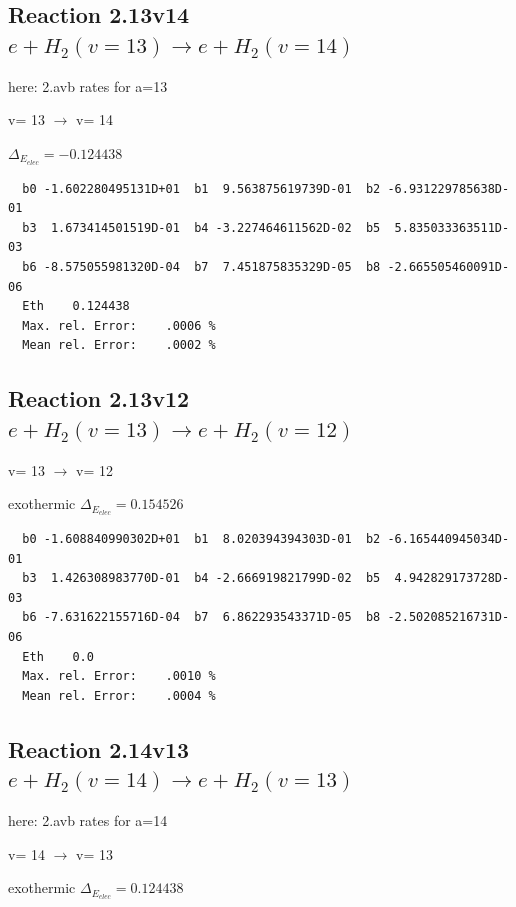 \documentclass[12pt,dvipdfmx]{article}
\begin{document}
\subsection{
Reaction 2.13v14
$ e + H_2(v=13) \rightarrow e + H_2(v=14) $
}
here: 2.avb rates for a=13


  v=  13 $\rightarrow$ v= 14

$\Delta_{E_{elec}}=-0.124438$


\begin{small}\begin{verbatim}
  b0 -1.602280495131D+01  b1  9.563875619739D-01  b2 -6.931229785638D-01
  b3  1.673414501519D-01  b4 -3.227464611562D-02  b5  5.835033363511D-03
  b6 -8.575055981320D-04  b7  7.451875835329D-05  b8 -2.665505460091D-06
  Eth    0.124438
  Max. rel. Error:    .0006 %
  Mean rel. Error:    .0002 %

\end{verbatim}\end{small}


\subsection{
Reaction 2.13v12
$ e + H_2(v=13) \rightarrow e + H_2(v=12) $
}

  v=  13 $\rightarrow$ v= 12

exothermic $\Delta_{E_{elec}}= 0.154526$




\begin{small}\begin{verbatim}
  b0 -1.608840990302D+01  b1  8.020394394303D-01  b2 -6.165440945034D-01
  b3  1.426308983770D-01  b4 -2.666919821799D-02  b5  4.942829173728D-03
  b6 -7.631622155716D-04  b7  6.862293543371D-05  b8 -2.502085216731D-06
  Eth    0.0
  Max. rel. Error:    .0010 %
  Mean rel. Error:    .0004 %

\end{verbatim}\end{small}

\newpage

\subsection{
Reaction 2.14v13
$ e + H_2(v=14) \rightarrow e + H_2(v=13) $
}

here: 2.avb rates for a=14


  v=  14 $\rightarrow$ v= 13

exothermic $\Delta_{E_{elec}}= 0.124438$
\end{document}
